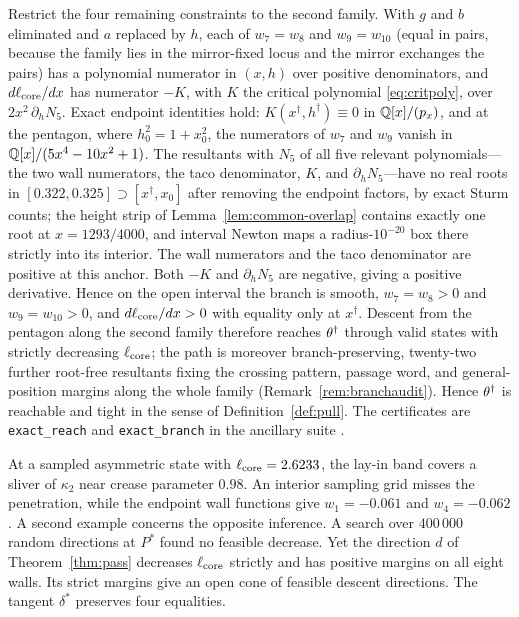 \begin{remark}\label{rem:edge}
Restrict the four remaining constraints to the second family. With $g$ and $b$ eliminated and $a$ replaced by $h$, each of $w_7=w_8$ and $w_9=w_{10}$ (equal in pairs, because the family lies in the mirror-fixed locus and the mirror exchanges the pairs) has a polynomial numerator in $(x,h)$ over positive denominators, and $d\ell_{\mathrm{core}}/dx$ has numerator $-K$, with $K$ the critical polynomial \eqref{eq:critpoly}, over $2x^2\,\partial_hN_5$. Exact endpoint identities hold: $K(x^\dagger,h^\dagger)\equiv0$ in $\mathbb{Q}[x]/(p_x)$, and at the pentagon, where $h_0^2=1+x_0^2$, the numerators of $w_7$ and $w_9$ vanish in $\mathbb{Q}[x]/(5x^4-10x^2+1)$. The resultants with $N_5$ of all five relevant polynomials---the two wall numerators, the taco denominator, $K$, and $\partial_hN_5$---have no real roots in $[0.322,0.325]\supset[x^\dagger,x_0]$ after removing the endpoint factors, by exact Sturm counts; the height strip of Lemma~\ref{lem:common-overlap} contains exactly one root at $x=1293/4000$, and interval Newton maps a radius-$10^{-20}$ box there strictly into its interior. The wall numerators and the taco denominator are positive at this anchor. Both $-K$ and $\partial_h N_5$ are negative, giving a positive derivative. Hence on the open interval the branch is smooth, $w_7=w_8>0$ and $w_9=w_{10}>0$, and $d\ell_{\mathrm{core}}/dx>0$ with equality only at $x^\dagger$. Descent from the pentagon along the second family therefore reaches $\theta^\dagger$ through valid states with strictly decreasing $\ell_{\mathrm{core}}$; the path is moreover branch-preserving, twenty-two further root-free resultants fixing the crossing pattern, passage word, and general-position margins along the whole family (Remark~\ref{rem:branchaudit}). Hence $\theta^\dagger$ is reachable and tight in the sense of Definition~\ref{def:pull}. The certificates are \texttt{exact\_reach} and \texttt{exact\_branch} in the ancillary suite \cite{anc}.
\end{remark}

\begin{remark}\label{rem:methods}
At a sampled asymmetric state with $\ell_{\mathrm{core}}=2.6233$, the lay-in band covers a sliver of $\kappa_2$ near crease parameter $0.98$. An interior sampling grid misses the penetration, while the endpoint wall functions give $w_1=-0.061$ and $w_4=-0.062$. A second example concerns the opposite inference. A search over $400\,000$ random directions at $P^*$ found no feasible decrease. Yet the direction $d$ of Theorem~\ref{thm:pass} decreases $\ell_{\mathrm{core}}$ strictly and has positive margins on all eight walls. Its strict margins give an open cone of feasible descent directions. The tangent $\delta^*$ preserves four equalities.
\end{remark}
